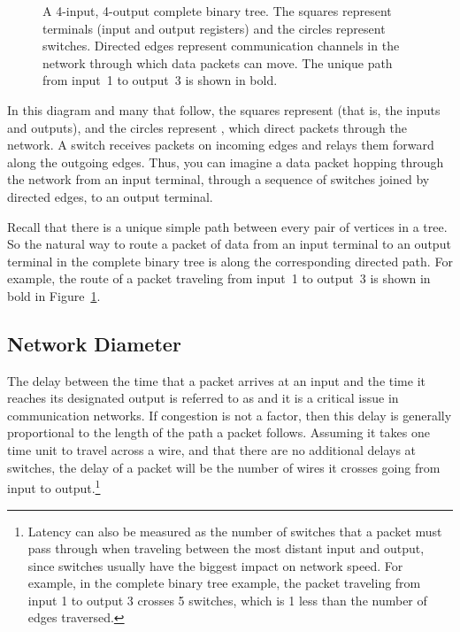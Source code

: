 \begin{figure}


\caption{A 4-input, 4-output complete binary tree.  The squares
  represent terminals (input and output registers) and the circles
  represent switches.  Directed edges represent communication channels
  in the network through which data packets can move.  The unique path
  from input~1 to output~3 is shown in bold.}

\label{fig:6EH}

\end{figure}

In this diagram and many that follow, the squares represent
 (that is, the inputs and outputs), and the circles
represent , which direct packets through the network.
A switch receives packets on incoming edges and relays them forward
along the outgoing edges.  Thus, you can imagine a data packet hopping
through the network from an input terminal, through a sequence of
switches joined by directed edges, to an output terminal.

Recall that there is a unique simple path between every pair of
vertices in a tree.  So the natural way to route a packet of data from
an input terminal to an output terminal in the complete binary tree is
along the corresponding directed path.  For example, the route of a
packet traveling from input~1 to output~3 is shown in bold in
Figure~\ref{fig:6EH}.

\subsection{Network Diameter}

The delay between the time that a packet arrives at an input and the
time it reaches its designated output is referred to as 
and it is a critical issue in communication networks.  If congestion
is not a factor, then this delay is generally proportional to the
length of the path a packet follows.  Assuming it takes one time unit
to travel across a wire, and that there are no additional delays at
switches, the delay of a packet will be the number of wires it crosses
going from input to output.\footnote{Latency can also be measured as
  the number of switches that a packet must pass through when
  traveling between the most distant input and output, since switches
  usually have the biggest impact on network speed.  For example, in
  the complete binary tree example, the packet traveling from input 1
  to output 3 crosses 5 switches, which is 1 less than the number of
  edges traversed.}

